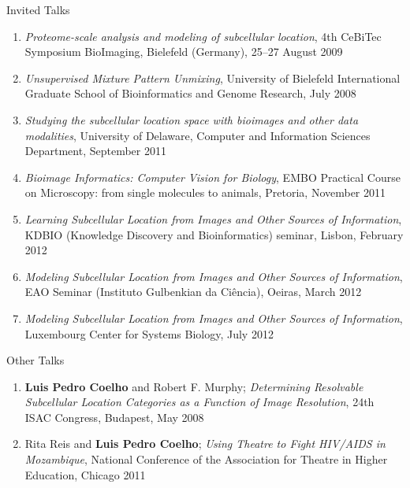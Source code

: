 \documentclass{article}
\renewcommand\subsection[1]{%
    \par\vspace{.1em}%
    {\hspace{1em}\subsubhead #1}%
    \par\vspace{.2em}%
}
\begin{document}
\subsection{Invited Talks}
\begin{enumerate}
\item \emph{Proteome-scale analysis and modeling of subcellular location}, 4th
CeBiTec Symposium BioImaging, Bielefeld (Germany), 25--27 August 2009
\item \emph{Unsupervised Mixture Pattern Unmixing}, University of Bielefeld
International Graduate School of Bioinformatics and Genome Research, July 2008
\item \emph{Studying the subcellular location space with bioimages and other
data modalities}, University of Delaware, Computer and Information Sciences
Department, September 2011
\item \emph{Bioimage Informatics: Computer Vision for Biology}, EMBO Practical
Course on Microscopy: from single molecules to animals, Pretoria, November 2011
\item \emph{Learning Subcellular Location from Images and Other Sources of
Information}, KDBIO (Knowledge Discovery and Bioinformatics) seminar, Lisbon,
February 2012
\item \emph{Modeling Subcellular Location from Images and Other Sources of
Information}, EAO Seminar (Instituto Gulbenkian da Ciência), Oeiras, March 2012
\item \emph{Modeling Subcellular Location from Images and Other Sources of
Information}, Luxembourg Center for Systems Biology, July 2012

\end{enumerate}


\subsection{Other Talks}

\begin{enumerate}
\item \textbf{Luis Pedro Coelho} and Robert F. Murphy; \emph{Determining
Resolvable Subcellular Location Categories as a Function of Image Resolution},
24th ISAC Congress, Budapest, May 2008
\item Rita Reis and \textbf{Luis Pedro Coelho}; \emph{Using Theatre to Fight
HIV/AIDS in Mozambique}, National Conference of the Association for Theatre in
Higher Education, Chicago 2011
\end{enumerate}
\end{document}
